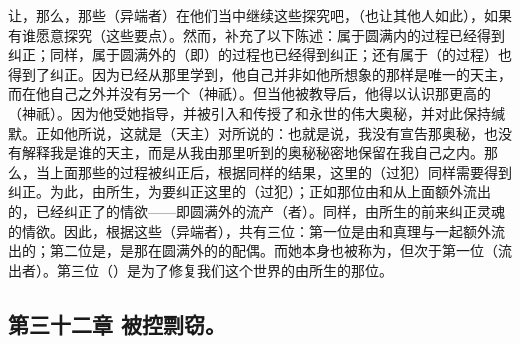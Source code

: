让，那么，那些（异端者）在他们当中继续这些探究吧，（也让其他人如此），如果有谁愿意探究（这些要点）。然而，补充了以下陈述：属于圆满内的过程已经得到纠正；同样，属于圆满外的（即）的过程也已经得到纠正；还有属于（的过程）也得到了纠正。因为已经从那里学到，他自己并非如他所想象的那样是唯一的天主，而在他自己之外并没有另一个（神祇）。但当他被教导后，他得以认识那更高的（神祇）。因为他受她指导，并被引入和传授了和永世的伟大奥秘，并对此保持缄默。正如他所说，这就是（天主）对所说的：也就是说，我没有宣告那奥秘，也没有解释我是谁的天主，而是从我由那里听到的奥秘秘密地保留在我自己之内。那么，当上面那些的过程被纠正后，根据同样的结果，这里的（过犯）同样需要得到纠正。为此，由所生，为要纠正这里的（过犯）；正如那位由和从上面额外流出的，已经纠正了的情欲——即圆满外的流产（者）。同样，由所生的前来纠正灵魂的情欲。因此，根据这些（异端者），共有三位：第一位是由和真理与一起额外流出的；第二位是，是那在圆满外的的配偶。而她本身也被称为，但次于第一位（流出者）。第三位（）是为了修复我们这个世界的由所生的那位。\par


\subsection{第三十二章 被控剽窃。}

